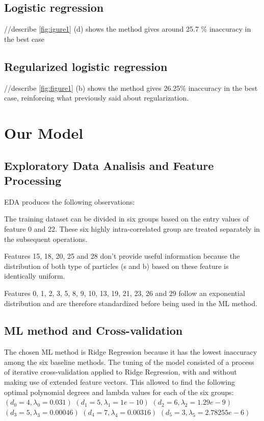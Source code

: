 \documentclass[10pt,conference,compsocconf]{IEEEtran}
\begin{document}
\subsection{Logistic regression}
//describe
\ref{fig:igure1} (d) shows the method gives around 25.7 \% inaccuracy in the best case
\subsection{Regularized logistic regression}
//describe
\ref{fig:figure1} (b) shows the method gives 26.25\% inaccuracy in the best case, reinforcing what previously said about regularization.
\section{Our Model}
\subsection{Exploratory Data Analisis and Feature Processing}
EDA produces the following observations:

The training dataset can be divided in six groups based on the entry values of feature 0 and 22. These six highly intra-correlated group are treated separately in the subsequent operations.

Features 15, 18, 20, 25 and 28 don't provide useful information because the distribution of both type of particles (s and b) based on these feature is  identically uniform.

Features 0, 1, 2, 3, 5, 8, 9, 10, 13, 19, 21, 23, 26 and 29 follow an exponential distribution and are therefore standardized before being used in the ML method.
\subsection{ML method and Cross-validation}
The chosen ML method is Ridge Regression because it has the lowest inaccuracy among the six baseline methods.
The tuning of the model consisted of a process of iterative cross-validation applied to Ridge Regression, with and without making use of extended feature vectors.
This allowed to find the following optimal polynomial degrees and lambda values for each of the six groups:
$(d_0 = 4, \lambda_0 = 0.031)$
$(d_1 = 5, \lambda_1 = 1e-10)$
$(d_2 = 6, \lambda_2 = 1.29e-9)$
$(d_3 = 5, \lambda_3 = 0.00046)$
$(d_4 = 7, \lambda_4 = 0.00316)$
$(d_5 = 3, \lambda_5 = 2.78255e-6)$
\end{document}
